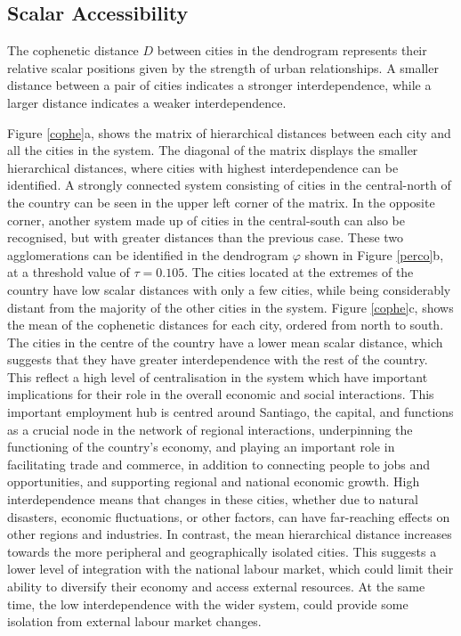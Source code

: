 \documentclass[11pt, a4paper]{article}
\begin{document}
 \subsection{Scalar Accessibility}

The cophenetic distance $D$ between cities in the dendrogram represents their relative scalar positions given by the strength of urban relationships. A smaller distance between a pair of cities indicates a stronger interdependence, while a larger distance indicates a weaker interdependence. 

Figure \ref{cophe}a, shows the matrix of hierarchical distances between each city and all the cities in the system. The diagonal of the matrix displays the smaller hierarchical distances, where cities  with highest interdependence can be identified. A strongly connected system consisting of cities in the central-north of the country can be seen in the upper left corner of the matrix. In the opposite corner, another system made up of cities in the central-south can also be recognised, but with greater distances than the previous case. These two agglomerations can be identified in the dendrogram $\varphi$ shown in Figure \ref{perco}b, at a threshold value of $\tau=0.105$. The cities located at the extremes of the country have low scalar distances with only a few cities, while being considerably distant from the majority of the other cities in the system. Figure \ref{cophe}c, shows the mean of the cophenetic distances for each city, ordered from north to south. The cities in the centre of the country have a lower mean scalar distance, which suggests that they have greater interdependence with the rest of the country. This reflect a high level of centralisation in the system which have important implications for their role in the overall economic and social interactions. This important employment hub is centred around Santiago, the capital, and functions as a crucial node in the network of regional interactions, underpinning the functioning of the country's economy, and playing an important role in facilitating trade and commerce, in addition to connecting people to jobs and opportunities, and supporting regional and national economic growth. High interdependence means that changes in these cities, whether due to natural disasters, economic fluctuations, or other factors, can have far-reaching effects on other regions and industries. In contrast, the mean hierarchical distance increases towards the more peripheral and geographically isolated cities. This suggests a lower level of integration with the national labour market, which could limit their ability to diversify their economy and access external resources. At the same time, the low interdependence with the wider system, could provide some isolation from external labour market changes. 
\end{document}
